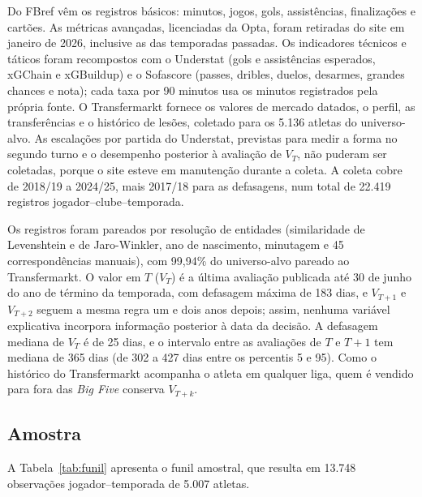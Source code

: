 \documentclass[article, 12pt, oneside, a4paper, english, brazil, section=TITLE]{abntex2}
\begin{document}
Do FBref vêm os registros básicos: minutos, jogos, gols, assistências, finalizações e cartões.
As métricas avançadas, licenciadas da Opta, foram retiradas do site em janeiro de 2026, inclusive as das temporadas passadas.
Os indicadores técnicos e táticos foram recompostos com o Understat (gols e assistências esperados, xGChain e xGBuildup) e o Sofascore (passes, dribles, duelos, desarmes, grandes chances e nota); cada taxa por 90 minutos usa os minutos registrados pela própria fonte.
O Transfermarkt fornece os valores de mercado datados, o perfil, as transferências e o histórico de lesões, coletado para os 5.136 atletas do universo-alvo.
As escalações por partida do Understat, previstas para medir a forma no segundo turno e o desempenho posterior à avaliação de $V_T$, não puderam ser coletadas, porque o site esteve em manutenção durante a coleta.
A coleta cobre de 2018/19 a 2024/25, mais 2017/18 para as defasagens, num total de 22.419 registros jogador–clube–temporada.

Os registros foram pareados por resolução de entidades (similaridade de Levenshtein e de Jaro-Winkler, ano de nascimento, minutagem e 45 correspondências manuais), com 99,94\% do universo-alvo pareado ao Transfermarkt.
O valor em $T$ ($V_T$) é a última avaliação publicada até 30 de junho do ano de término da temporada, com defasagem máxima de 183 dias, e $V_{T+1}$ e $V_{T+2}$ seguem a mesma regra um e dois anos depois; assim, nenhuma variável explicativa incorpora informação posterior à data da decisão.
A defasagem mediana de $V_T$ é de 25 dias, e o intervalo entre as avaliações de $T$ e $T+1$ tem mediana de 365 dias (de 302 a 427 dias entre os percentis 5 e 95).
Como o histórico do Transfermarkt acompanha o atleta em qualquer liga, quem é vendido para fora das \textit{Big Five} conserva $V_{T+k}$.

\subsection{Amostra}

A Tabela~\ref{tab:funil} apresenta o funil amostral, que resulta em 13.748 observações jogador–temporada de 5.007 atletas.
\end{document}
